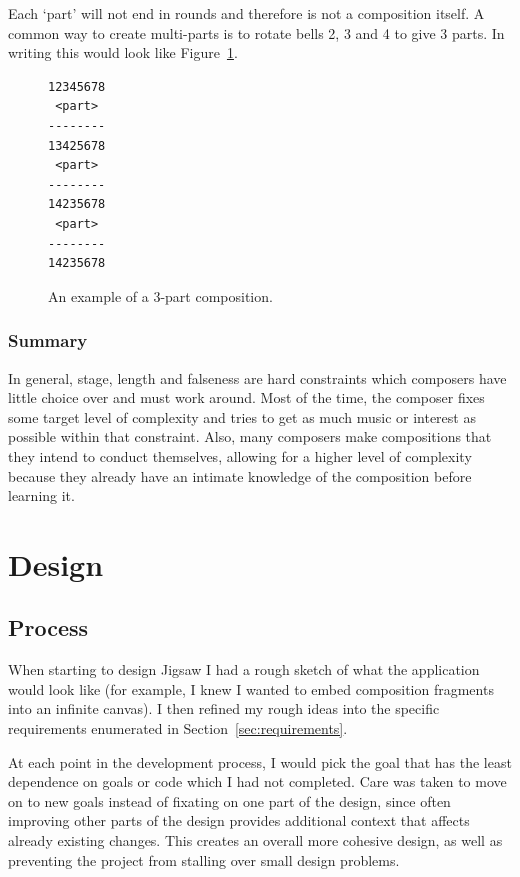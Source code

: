\documentclass[12pt]{article}
\begin{document}
Each `part' will not end in rounds and therefore is not a composition itself.  A common way to
create multi-parts is to rotate bells 2, 3 and 4 to give 3 parts.  In writing this would look like
Figure~\ref{fig:multi-part}.

\begin{figure}
    \centering
    \begin{BVerbatim}
12345678
 <part>
--------
13425678
 <part>
--------
14235678
 <part>
--------
14235678
    \end{BVerbatim}
    \caption{An example of a 3-part composition.}\label{fig:multi-part}
\end{figure}

\subsubsection{Summary}

In general, stage, length and falseness are hard constraints which composers have little choice over
and must work around.  Most of the time, the composer fixes some target level of complexity and
tries to get as much music or interest as possible within that constraint.  Also, many composers
make compositions that they intend to conduct themselves, allowing for a higher level of complexity
because they already have an intimate knowledge of the composition before learning it.



\pagebreak

\section{Design}

\subsection{Process}

When starting to design Jigsaw I had a rough sketch of what the application would look like (for
example, I knew I wanted to embed composition fragments into an infinite canvas).  I then refined my
rough ideas into the specific requirements enumerated in Section~\ref{sec:requirements}.

At each point in the development process, I would pick the goal that has the least dependence on
goals or code which I had not completed.  Care was taken to move on to new goals instead of fixating
on one part of the design, since often improving other parts of the design provides additional
context that affects already existing changes.  This creates an overall more cohesive design, as
well as preventing the project from stalling over small design problems.
\end{document}
